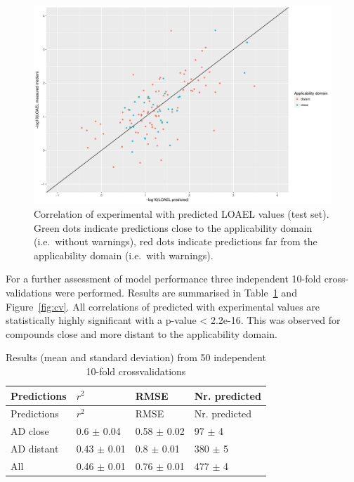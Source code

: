 \documentclass[]{achemso}
\begin{document}
\begin{figure}
\centering
\includegraphics{figures/prediction-test-correlation.pdf}
\caption{Correlation of experimental with predicted LOAEL values (test
set). Green dots indicate predictions close to the applicability domain
(i.e.~without warnings), red dots indicate predictions far from the
applicability domain (i.e.~with warnings).}\label{fig:corr}
\end{figure}

For a further assessment of model performance three independent 10-fold
cross-validations were performed. Results are summarised in
Table~\ref{tbl:cv} and Figure~\ref{fig:cv}. All correlations of
predicted with experimental values are statistically highly significant
with a p-value \textless{} 2.2e-16. This was observed for compounds
close and more distant to the applicability domain.

\hypertarget{tbl:cv}{}
\begin{longtable}[]{@{}llll@{}}
\caption{\label{tbl:cv}Results (mean and standard deviation) from 50
independent 10-fold crossvalidations }\tabularnewline
\toprule
Predictions & \(r^2\) & RMSE & Nr. predicted\tabularnewline
\midrule
\endfirsthead
\toprule
Predictions & \(r^2\) & RMSE & Nr. predicted\tabularnewline
\midrule
\endhead
AD close & 0.6 \(\pm\) 0.04 & 0.58 \(\pm\) 0.02 & 97 \(\pm\)
4\tabularnewline
AD distant & 0.43 \(\pm\) 0.01 & 0.8 \(\pm\) 0.01 & 380 \(\pm\)
5\tabularnewline
All & 0.46 \(\pm\) 0.01 & 0.76 \(\pm\) 0.01 & 477 \(\pm\)
4\tabularnewline
\bottomrule
\end{longtable}
\end{document}
